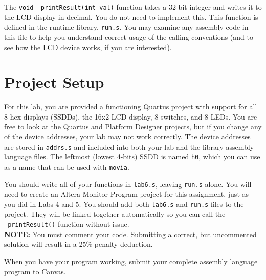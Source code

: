 \documentclass[10pt]{article}
\begin{document}
The {\tt void \_printResult(int val)} function takes a 32-bit integer and
writes it to the LCD display in decimal. You do not need to implement this.
This function is defined in the runtime library, {\tt run.s}. You may examine
any assembly code in this file to help you understand correct usage of the calling
conventions (and to see how the LCD device works, if you are interested).

\section*{Project Setup}

For this lab, you are provided a functioning Quartus project with support for
all 8 hex displays (SSDDs), the 16x2 LCD display, 8 switches, and 8 LEDs. You
are free to look at the Quartus and Platform Designer projects, but if you
change any of the device addresses, your lab may not work correctly. The
device addresses are stored in {\tt addrs.s} and included into both your lab
and the library assembly language files. The leftmost (lowest 4-bits) SSDD is
named {\tt h0}, which you can use as a name that can be used with {\tt movia}.

You should write all of your functions in {\tt lab6.s}, leaving {\tt run.s}
alone. You will need to create an Altera Monitor Program project for this
assignment, just as you did in Labs 4 and 5. You should add both {\tt lab6.s}
and {\tt run.s} files to the project. They will be linked together automatically
so you can call the {\tt \_printResult()} function without issue.\\

{\bf NOTE:} You must comment your code. Submitting a correct, but
uncommented solution will result in a 25\% penalty deduction.

When you have your program working, submit your complete assembly
language program to Canvas.
\end{document}
